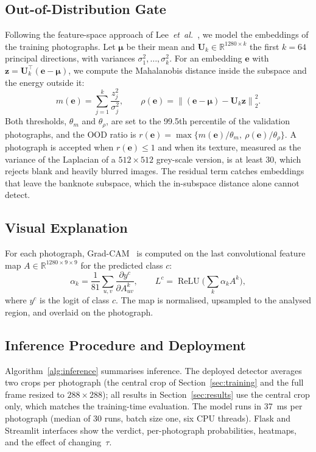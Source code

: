 \documentclass[journal]{IEEEtran}
\begin{document}
\subsection{Out-of-Distribution Gate}
\label{sec:ood}
Following the feature-space approach of Lee~\textit{et~al.}~\cite{lee2018mahalanobis},
we model the embeddings of the training photographs. Let $\boldsymbol{\mu}$ be their
mean and $\mathbf{U}_k\in\mathbb{R}^{1280\times k}$ the first $k=64$ principal directions,
with variances $\sigma_1^2,\dots,\sigma_k^2$. For an embedding $\mathbf{e}$ with
$\mathbf{z}=\mathbf{U}_k^{\top}(\mathbf{e}-\boldsymbol{\mu})$, we compute the Mahalanobis
distance inside the subspace and the energy outside it:
\begin{equation}
m(\mathbf{e}) = \sum_{j=1}^{k}\frac{z_j^2}{\sigma_j^2},\qquad
\rho(\mathbf{e}) = \left\lVert(\mathbf{e}-\boldsymbol{\mu})-\mathbf{U}_k\mathbf{z}\right\rVert_2^2 .
\label{eq:ood}
\end{equation}
Both thresholds, $\theta_m$ and $\theta_\rho$, are set to the 99.5th percentile of the
validation photographs, and the OOD ratio is
$r(\mathbf{e})=\max\{m(\mathbf{e})/\theta_m,\ \rho(\mathbf{e})/\theta_\rho\}$. A
photograph is accepted when $r(\mathbf{e})\le1$ and when its texture, measured as the
variance of the Laplacian of a $512\times512$ grey-scale version, is at least 30, which
rejects blank and heavily blurred images. The residual term catches embeddings that leave
the banknote subspace, which the in-subspace distance alone cannot detect.

\subsection{Visual Explanation}
For each photograph, Grad-CAM~\cite{selvaraju2017gradcam} is computed on the last
convolutional feature map $A\in\mathbb{R}^{1280\times9\times9}$ for the predicted class $c$:
\begin{equation}
\alpha_k = \frac{1}{81}\sum_{u,v}\frac{\partial y^{c}}{\partial A^{k}_{uv}},\qquad
L^{c} = \operatorname{ReLU}\!\Big(\sum_{k}\alpha_k A^{k}\Big),
\label{eq:gradcam}
\end{equation}
where $y^c$ is the logit of class $c$. The map is normalised, upsampled to the analysed
region, and overlaid on the photograph.

\subsection{Inference Procedure and Deployment}
Algorithm~\ref{alg:inference} summarises inference. The deployed detector averages two
crops per photograph (the central crop of Section~\ref{sec:training} and the full frame
resized to $288\times288$); all results in Section~\ref{sec:results} use the central crop
only, which matches the training-time evaluation. The model runs in 37~ms per
photograph (median of 30 runs, batch size one, six CPU threads). Flask and Streamlit
interfaces show the verdict, per-photograph probabilities, heatmaps, and the effect of
changing~$\tau$.
\end{document}

